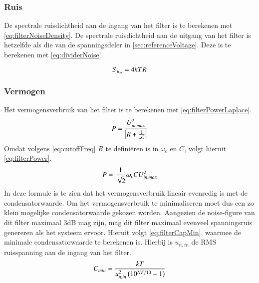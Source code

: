 \subsubsection{Ruis}
De spectrale ruisdichtheid aan de ingang van het filter is te berekenen met \cref{eq:filterNoiseDensity}.
De spectrale ruisdichtheid aan de uitgang van het filter is hetzelfde als die van de spanningsdeler in \cref{sec:referenceVoltage}. Deze is te berekenen met \cref{eq:dividerNoise}.




\begin{equation} \label{eq:filterNoiseDensity}
    S_{u_{in}} = 4kTR
    \tagaddtext{[\si{\volt\squared\per\hertz}]}
\end{equation}


\subsubsection{Vermogen}
Het vermogensverbruik van het filter is te berekenen met \cref{eq:filterPowerLaplace}.
\begin{equation} \label{eq:filterPowerLaplace}
    P = \frac{U_{in,max}^2}{\left|R + \frac{1}{sC}\right|}
    \tagaddtext{[\si{\watt}]}
\end{equation}
Omdat volgens \cref{eq:cutoffFreq} $R$ te definiëren is in $\omega_c$ en $C$, volgt hieruit \cref{eq:filterPower}.
\begin{equation} \label{eq:filterPower}
    P = \frac{1}{\sqrt{2}}\omega_cCU_{in,max}^2
    \tagaddtext{[\si{\watt}]}
\end{equation}
In deze formule is te zien dat het vermogensverbruik lineair evenredig is met de condensatorwaarde. Om het vermogensverbruik te minimaliseren moet dus een zo klein mogelijke condensatorwaarde gekozen worden. Aangezien de noise-figure van dit filter maximaal 3dB mag zijn, mag dit filter maximaal evenveel spanningsruis genereren als het systeem ervoor. Hieruit volgt \cref{eq:filterCapMin}, waarmee de minimale condensatorwaarde te berekenen is. Hierbij is $u_{n,in}$ de RMS ruisspanning aan de ingang van het filter.
\begin{equation} \label{eq:filterCapMin}
    C_{min} = \frac{kT}{u_{n,in}^2\left(10^{NF/10}-1\right)}
    \tagaddtext{[\si{\farad}]}
\end{equation}

